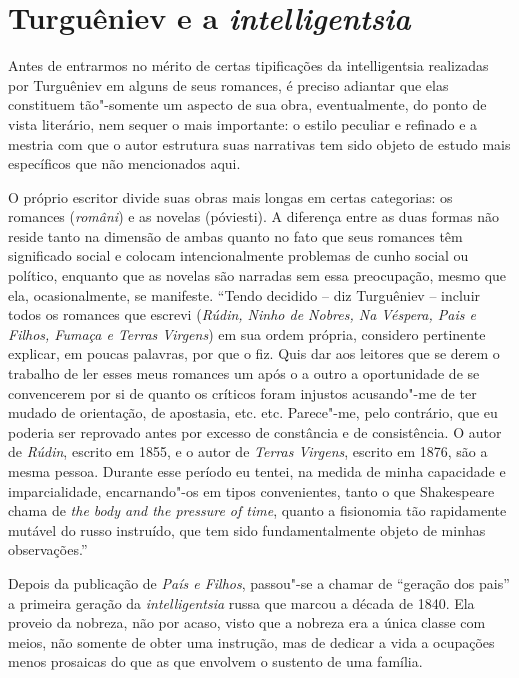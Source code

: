 \section{Turguêniev e a \emph{intelligentsia}}

Antes de entrarmos no mérito de certas tipificações da intelligentsia
realizadas por Turguêniev em alguns de seus romances, é preciso adiantar
que elas constituem tão"-somente um aspecto de sua obra, eventualmente,
do ponto de vista literário, nem sequer o mais importante: o estilo
peculiar e refinado e a mestria com que o autor estrutura suas
narrativas tem sido objeto de estudo mais específicos que não
mencionados aqui.

O próprio escritor divide suas obras mais longas em certas categorias:
os romances (\emph{români}) e as novelas (póviesti). A diferença entre
as duas formas não reside tanto na dimensão de ambas quanto no fato que
seus romances têm significado social e colocam intencionalmente
problemas de cunho social ou político, enquanto que as novelas são
narradas sem essa preocupação, mesmo que ela, ocasionalmente, se
manifeste. ``Tendo decidido -- diz Turguêniev -- incluir todos os
romances que escrevi (\emph{Rúdin, Ninho de Nobres, Na Véspera, Pais e
Filhos, Fumaça e Terras Virgens}) em sua ordem própria, considero
pertinente explicar, em poucas palavras, por que o fiz. Quis dar aos
leitores que se derem o trabalho de ler esses meus romances um após o a
outro a oportunidade de se convencerem por si de quanto os críticos
foram injustos acusando"-me de ter mudado de orientação, de apostasia,
etc. etc. Parece"-me, pelo contrário, que eu poderia ser reprovado antes
por excesso de constância e de consistência. O autor de \emph{Rúdin},
escrito em 1855, e o autor de \emph{Terras Virgens}, escrito em 1876,
são a mesma pessoa. Durante esse período eu tentei, na medida de minha
capacidade e imparcialidade, encarnando"-os em tipos convenientes, tanto
o que Shakespeare chama de \emph{the body and the pressure of time},
quanto a fisionomia tão rapidamente mutável do russo instruído, que tem
sido fundamentalmente objeto de minhas observações.''

Depois da publicação de \emph{País e Filhos}, passou"-se a chamar de
``geração dos pais'' a primeira geração da \emph{intelligentsia} russa
que marcou a década de 1840. Ela proveio da nobreza, não por acaso,
visto que a nobreza era a única classe com meios, não somente de obter
uma instrução, mas de dedicar a vida a ocupações menos prosaicas do que
as que envolvem o sustento de uma família.

